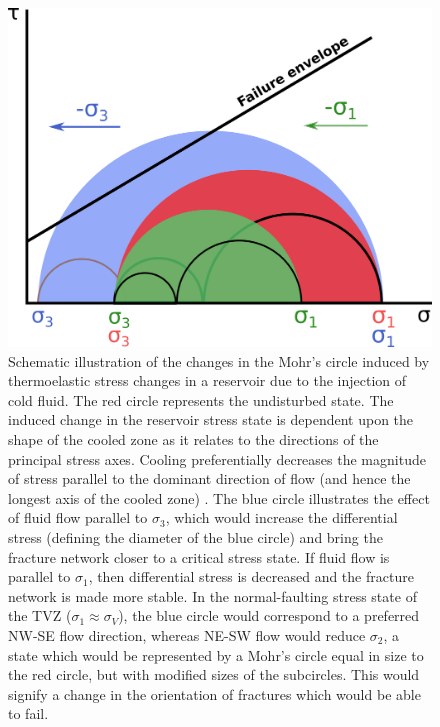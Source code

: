 \begin{figure}[h!]
\begin{center}
\includegraphics[width=0.7\columnwidth]{Chapter_1_Intro/figures/T_decrease_mohr/T_decrease_mohr}
\caption[Mohr's circles showing the effect of thermo-elastic stress reduction]{{
Schematic illustration of the changes in the Mohr's circle induced by
thermoelastic stress changes in a reservoir due to the injection of cold
fluid. The red circle represents the undisturbed state. The
induced change in the reservoir stress state is dependent upon the
shape of the cooled zone as it relates to the directions of the principal
stress axes. Cooling preferentially decreases the magnitude of stress
parallel to the dominant direction of flow (and hence the longest axis of the cooled zone) \citep{Jeanne_2014}. The blue circle illustrates the effect of fluid flow parallel
to $\sigma_{3}$, which would increase the differential stress (defining the diameter of the blue circle) and bring the fracture network closer to a critical stress state. If
fluid flow is parallel to $\sigma_{1}$, then differential stress
is decreased and the fracture network is made more stable. In the
normal-faulting stress state of the \acrshort{TVZ} ($\sigma_{1}\approx{\sigma_{V}}$), the blue circle would correspond to a preferred NW-SE flow
direction, whereas NE-SW flow would reduce $\sigma_2$, a state
which would be represented by a Mohr's circle equal in size to the red
circle, but with modified sizes of the subcircles. This would signify a
change in the orientation of fractures which would be able to fail.
{\label{621452}}%
}}
\end{center}
\end{figure}


